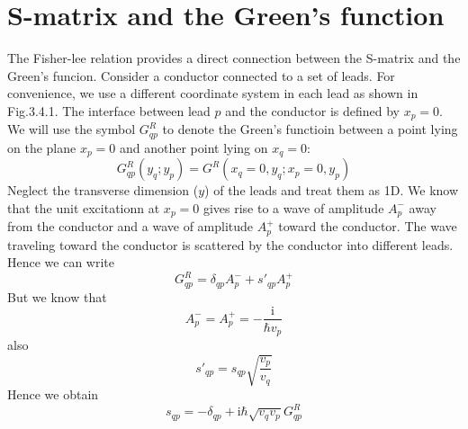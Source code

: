 \documentclass[11pt,a4paper]{book}
\theoremstyle{plain}
\theoremstyle{definition}
\theoremstyle{remark}
\newcommand{\ii}{\mathrm{i}}                      %
\begin{document}
\section{S-matrix and the Green's function}
The Fisher-lee relation provides a direct connection between the S-matrix and the Green's funcion. Consider a conductor connected to a set of leads. For convenience, we use a different coordinate system in each lead as shown in Fig.3.4.1. The interface between lead $p$ and the conductor is defined by $x_p = 0$. We will use the symbol $G^R_{qp}$ to denote the Green's functioin between a point lying on the plane $x_p=0$ and another point lying on $x_q =0$:
\begin{equation}
    G^R_{qp}(y_q; y_p) = G^R(x_q = 0, y_q; x_p=0, y_p)
\end{equation}
Neglect the transverse dimension ($y$) of the leads and treat them as 1D. We know that the unit excitationn at $x_p=0$ gives rise to a wave of amplitude $A_p^-$ away from the conductor and a wave of amplitude $A_p^+$ toward the conductor. The wave traveling toward the conductor is scattered by the conductor into different leads. Hence we can write
\begin{equation}
    G^R_{qp} = \delta_{qp}A_p^- + s'_{qp} A_p^+
\end{equation}
But we know that
\begin{equation}
    A_p^- = A_p^+ = -\frac{\ii}{\hbar v_p}
\end{equation}
also
\begin{equation}
    s'_{qp} = s_{qp} \sqrt{\frac{v_p}{v_q}}
\end{equation}
Hence we obtain
\begin{equation}
    s_{qp} = -\delta_{qp} + \ii \hbar \sqrt{v_q v_p} G^R_{qp}
\end{equation}
\end{document}
